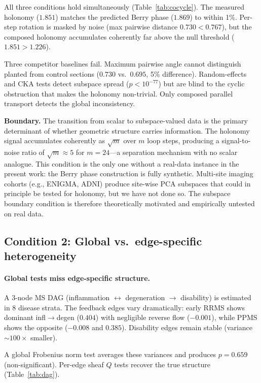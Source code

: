 \documentclass{article}
\begin{document}
All three conditions hold simultaneously (Table~\ref{tab:cocycle}).
The measured holonomy ($1.851$) matches the predicted Berry phase ($1.869$) to within 1\%.
Per-step rotation is masked by noise (max pairwise distance $0.730 < 0.767$), but the composed holonomy accumulates coherently far above the null threshold ($1.851 > 1.226$).

Three competitor baselines fail.
Maximum pairwise angle cannot distinguish planted from control sections ($0.730$ vs.\ $0.695$, 5\% difference).
Random-effects and CKA tests detect subspace spread ($p < 10^{-77}$) but are blind to the cyclic obstruction that makes the holonomy non-trivial.
Only composed parallel transport detects the global inconsistency.

\textbf{Boundary.} The transition from scalar to subspace-valued data is the primary determinant of whether geometric structure carries information.
The holonomy signal accumulates coherently as $\sqrt{m}$ over $m$ loop steps, producing a signal-to-noise ratio of $\sqrt{m} \approx 5$ for $m = 24$---a separation mechanism with no scalar analogue.
This condition is the only one without a real-data instance in the present work: the Berry phase construction is fully synthetic.
Multi-site imaging cohorts (e.g., ENIGMA, ADNI) produce site-wise PCA subspaces that could in principle be tested for holonomy, but we have not done so.
The subspace boundary condition is therefore theoretically motivated and empirically untested on real data.

\subsection{Condition 2: Global vs.\ edge-specific heterogeneity}
\label{sec:res-global-vs-edge}

\paragraph{Global tests miss edge-specific structure.}
A 3-node MS DAG (inflammation $\leftrightarrow$ degeneration $\to$ disability) is estimated in 8 disease strata.
The feedback edges vary dramatically: early RRMS shows dominant infl$\to$degen ($0.404$) with negligible reverse flow ($-0.001$), while PPMS shows the opposite ($-0.008$ and $0.385$).
Disability edges remain stable (variance $\sim\!100\times$ smaller).

A global Frobenius norm test averages these variances and produces $p = 0.659$ (non-significant).
Per-edge sheaf $Q$ tests recover the true structure (Table~\ref{tab:dag}).
\end{document}
